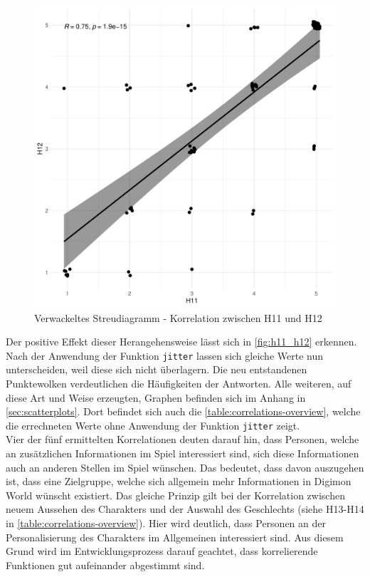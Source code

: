 \begin{figure}[H]
\centering
\includegraphics[width=0.65\columnwidth]{figures/plots/h11_h12.pdf}
\caption{\label{fig:h11_h12} Verwackeltes Streudiagramm - Korrelation zwischen H11 und H12}
\end{figure}

Der positive Effekt dieser Herangehensweise lässt sich in \autoref{fig:h11_h12} erkennen. Nach der Anwendung der Funktion \texttt{jitter} lassen sich gleiche Werte nun unterscheiden, weil diese sich nicht überlagern. Die neu entstandenen Punktewolken verdeutlichen die Häufigkeiten der Antworten. Alle weiteren, auf diese Art und Weise erzeugten, Graphen befinden sich im Anhang in \autoref{sec:scatterplots}. Dort befindet sich auch die \autoref{table:correlations-overview}, welche die errechneten Werte ohne Anwendung der Funktion \texttt{jitter} zeigt.\\

Vier der fünf ermittelten Korrelationen deuten darauf hin, dass Personen, welche an zusätzlichen Informationen im Spiel interessiert sind, sich diese Informationen auch an anderen Stellen im Spiel wünschen. Das bedeutet, dass davon auszugehen ist, dass eine Zielgruppe, welche sich allgemein mehr Informationen in Digimon World wünscht existiert. Das gleiche Prinzip gilt bei der Korrelation zwischen neuem Aussehen des Charakters und der Auswahl des Geschlechts (siehe H13-H14 in \autoref{table:correlations-overview}). Hier wird deutlich, dass Personen an der Personalisierung des Charakters im Allgemeinen interessiert sind. Aus diesem Grund wird im Entwicklungsprozess darauf geachtet, dass korrelierende Funktionen gut aufeinander abgestimmt sind.\\

